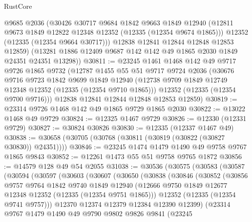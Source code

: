 \begin{lexlean}{RustCore}
\begin{coremodule}
        @9685
        @2036
        (@30426
          @30717
          @9684
          @1842
          @9663
          @1849
          @12940
          (@12811 @9673 @1849 @12822 @12348 @12352 (@12335 (@12354 @9674 @1865)))
          @12352
          (@12335 (@12354 @9664 @30717)))
        @12838
        @12841
        @12844
        @12848
        @12853
        @12859)
      (@13281 @1886 @12409 @9687 @142 @142 @49 @1865 @2030 @1849 @24351 @24351 @13298))
@30811 := @23245
    @1461
    @1468
    @142
    @49
    @9717
    @9726
    @1865
    @9732
    (@12787
      @1455
      @55
      @51
      @9717
      @9724
      @2036
      (@30676
        @9716
        @9723
        @1842
        @9699
        @1849
        @12940
        (@12738 @9709 @1849 @12749 @12348 @12352 (@12335 (@12354 @9710 @1865)))
        @12352
        (@12335 (@12354 @9700 @9716)))
      @12838
      @12841
      @12844
      @12848
      @12853
      @12859)
@30819 := @23314 @9726 @1468 @142 @49 @1865 @9729 @1865 @2030
@30822 := @13022 @1468 @49 @9729
@30824 := @12325 @1467 @9729
@30826 := @12330 (@12331 @9729)
@30827 := @30824 @30826
@30830 := @12335 (@12337 @1467 @49)
@30838 := @30658 (@30705 (@30768 (@30811 (@30819 (@30822 (@30827 @30830)) @24351))))
@30846 := @23245 @1474 @1479 @1490 @49 @9758 @9767 @1865 @9843
@30852 := @12261 @1473 @55 @51 @9758 @9765 @1872
@30856 := @14579 @128 @49 @54 @2055
@31038 := @30536
    (@30575
      (@30583
        (@30587
          (@30594
            (@30597
              (@30603
                (@30607
                  (@30650
                    (@30838
                      (@30846
                        (@30852
                          (@30856
                            @9757
                            @9764
                            @1842
                            @9740
                            @1849
                            @12940
                            (@12666 @9750 @1849 @12677 @12348 @12352 (@12335 (@12354 @9751 @1865)))
                            @12352
                            (@12335 (@12354 @9741 @9757)))
                          @12370
                          @12374
                          @12379
                          @12384
                          @12390
                          @12399)
                        (@23314
                          @9767
                          @1479
                          @1490
                          @49
                          @9790
                          @9802
                          @9826
                          @9841
                          (@23245

\end{coremodule}
\end{lexlean}
